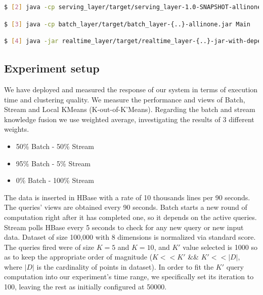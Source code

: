 \documentclass{lmproj}
\begin{document}
\begin{lstlisting}[language=bash]
$ [2] java -cp serving_layer/target/serving_layer-1.0-SNAPSHOT-allinone.jar {option -f with a given queries file}
\end{lstlisting}

\begin{lstlisting}[language=bash]
$ [3] java -cp batch_layer/target/batch_layer-{..}-allinone.jar Main
\end{lstlisting}

\begin{lstlisting}[language=bash]
$ [4] java -jar realtime_layer/target/realtime_layer-{..}-jar-with-dependencies.jar
\end{lstlisting}


\subsection{Experiment setup}

We have deployed and measured the response of our system in terms of execution time and clustering quality. We measure the performance and views of Batch, Stream and Local KMeans (K-out-of-K'Means). Regarding the batch and stream knowledge fusion we use weighted average, investigating the results of 3 different weights.

\begin{itemize}
	\item 50\% Batch - 50\% Stream
	\item 95\% Batch - 5\% Stream
	\item 0\% Batch - 100\% Stream
\end{itemize}

The data is inserted in HBase with a rate of 10 thousands lines per 90 seconds. The queries' views are obtained every 90 seconds. Batch starts a new round of computation right after it has completed one, so it depends on the active queries. Stream polls HBase every 5 seconds to check for any new query or new input data. Dataset of size 100,000 with 8 dimensions is normalized via standard score. The queries fired were of size $K = 5$ and $K = 10$, and $K'$ value selected is 1000 so as to keep the appropriate order of magnitude ($K<<K'$ \&\& $K'<<|D|$, where $|D|$ is the cardinality of points in dataset). In order to fit the $K'$ query computation into our experiment's time range, we specifically set its iteration to 100, leaving the rest as initially configured at 50000.
\end{document}
